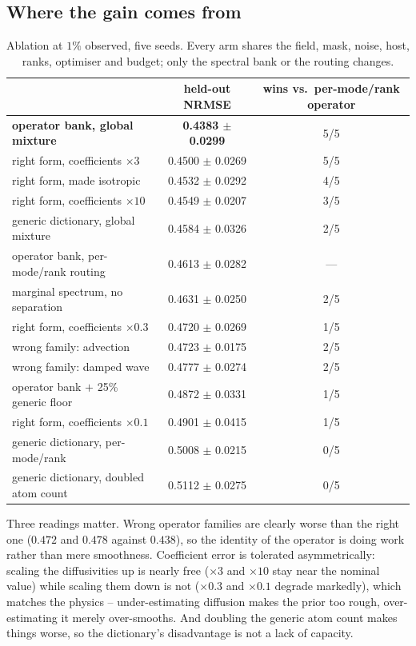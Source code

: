 \subsection{Where the gain comes from}

\begin{table}[t]
  \centering
  \caption{Ablation at $1\%$ observed, five seeds.  Every arm shares the field,
  mask, noise, host, ranks, optimiser and budget; only the spectral bank or the
  routing changes.}
  \label{tab:ablation}
  \small
  \begin{tabular}{lcc}
    \toprule
    & held-out NRMSE & wins vs.\ per-mode/rank operator \\
    \midrule
    \textbf{operator bank, global mixture}   & \textbf{0.4383 $\pm$ 0.0299} & 5/5 \\
    right form, coefficients $\times 3$      & 0.4500 $\pm$ 0.0269 & 5/5 \\
    right form, made isotropic               & 0.4532 $\pm$ 0.0292 & 4/5 \\
    right form, coefficients $\times 10$     & 0.4549 $\pm$ 0.0207 & 3/5 \\
    generic dictionary, global mixture       & 0.4584 $\pm$ 0.0326 & 2/5 \\
    operator bank, per-mode/rank routing     & 0.4613 $\pm$ 0.0282 & --- \\
    marginal spectrum, no separation         & 0.4631 $\pm$ 0.0250 & 2/5 \\
    right form, coefficients $\times 0.3$    & 0.4720 $\pm$ 0.0269 & 1/5 \\
    wrong family: advection                  & 0.4723 $\pm$ 0.0175 & 2/5 \\
    wrong family: damped wave                & 0.4777 $\pm$ 0.0274 & 2/5 \\
    operator bank $+$ 25\% generic floor     & 0.4872 $\pm$ 0.0331 & 1/5 \\
    right form, coefficients $\times 0.1$    & 0.4901 $\pm$ 0.0415 & 1/5 \\
    generic dictionary, per-mode/rank        & 0.5008 $\pm$ 0.0215 & 0/5 \\
    generic dictionary, doubled atom count   & 0.5112 $\pm$ 0.0275 & 0/5 \\
    \bottomrule
  \end{tabular}
\end{table}

Three readings matter.  Wrong operator families are clearly worse than the right
one ($0.472$ and $0.478$ against $0.438$), so the identity of the operator is
doing work rather than mere smoothness.  Coefficient error is tolerated
asymmetrically: scaling the diffusivities up is nearly free ($\times 3$ and
$\times 10$ stay near the nominal value) while scaling them down is not
($\times 0.3$ and $\times 0.1$ degrade markedly), which matches the physics --
under-estimating diffusion makes the prior too rough, over-estimating it merely
over-smooths.  And doubling the generic atom count makes things worse, so the
dictionary's disadvantage is not a lack of capacity.

